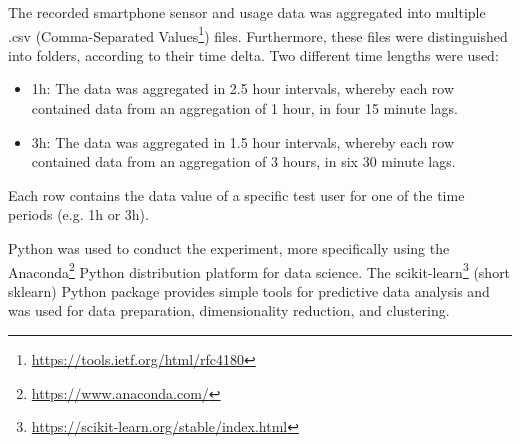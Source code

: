 The recorded smartphone sensor and usage data was aggregated into multiple .csv (Comma-Separated Values\footnote{\url{https://tools.ietf.org/html/rfc4180}}) files. Furthermore, these files were distinguished into folders, according to their time delta. Two different time lengths were used:

\begin{itemize}
  \item 1h: The data was aggregated in 2.5 hour intervals, whereby each row contained data from an aggregation of 1 hour, in four 15 minute lags.
  \item 3h: The data was aggregated in 1.5 hour intervals, whereby each row contained data from an aggregation of 3 hours, in six 30 minute lags.
\end{itemize}

Each row contains the data value of a specific test user for one of the time periods (e.g. 1h or 3h).

Python was used to conduct the experiment, more specifically using the Anaconda\footnote{\url{https://www.anaconda.com/}} Python distribution platform for data science. The scikit-learn\footnote{\url{https://scikit-learn.org/stable/index.html}} (short sklearn) Python package provides simple tools for predictive data analysis and was used for data preparation, dimensionality reduction, and clustering.









